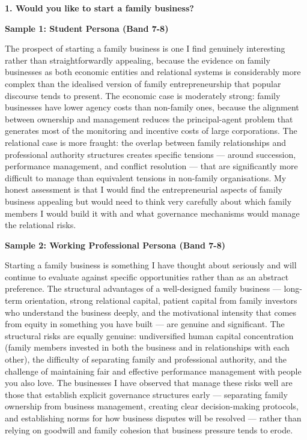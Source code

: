 \partthreeheader

\begin{ieltsquestion}
\textbf{1. Would you like to start a family business?}
\end{ieltsquestion}
\textbf{Sample 1: Student Persona (Band 7-8)}

The prospect of starting a family business is one I find genuinely interesting rather than straightforwardly appealing, because the evidence on family businesses as both economic entities and relational systems is considerably more complex than the idealised version of family entrepreneurship that popular discourse tends to present. The economic case is moderately strong: family businesses have lower agency costs than non-family ones, because the alignment between ownership and management reduces the principal-agent problem that generates most of the monitoring and incentive costs of large corporations. The relational case is more fraught: the overlap between family relationships and professional authority structures creates specific tensions — around succession, performance management, and conflict resolution — that are significantly more difficult to manage than equivalent tensions in non-family organisations. My honest assessment is that I would find the entrepreneurial aspects of family business appealing but would need to think very carefully about which family members I would build it with and what governance mechanisms would manage the relational risks.

\textbf{Sample 2: Working Professional Persona (Band 7-8)}

Starting a family business is something I have thought about seriously and will continue to evaluate against specific opportunities rather than as an abstract preference. The structural advantages of a well-designed family business — long-term orientation, strong relational capital, patient capital from family investors who understand the business deeply, and the motivational intensity that comes from equity in something you have built — are genuine and significant. The structural risks are equally genuine: undiversified human capital concentration (family members invested in both the business and in relationships with each other), the difficulty of separating family and professional authority, and the challenge of maintaining fair and effective performance management with people you also love. The businesses I have observed that manage these risks well are those that establish explicit governance structures early — separating family ownership from business management, creating clear decision-making protocols, and establishing norms for how business disputes will be resolved — rather than relying on goodwill and family cohesion that business pressure tends to erode.

